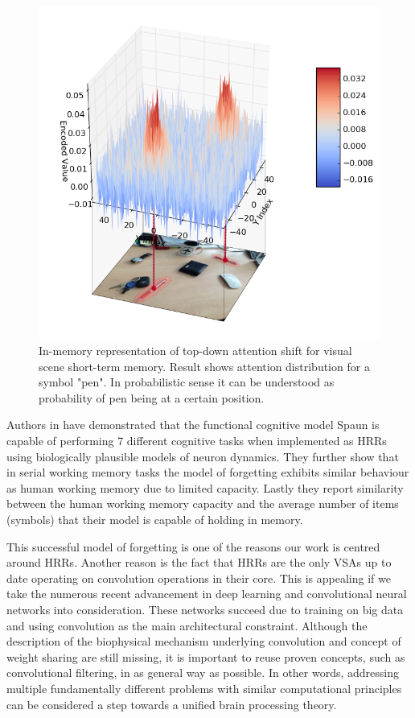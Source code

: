 \documentclass[conference]{IEEEtran}
\begin{document}
	
	\begin{figure}
		\center
		\includegraphics[width=0.9\columnwidth]{img/probe_for_pen_w_img.png}
		\caption{In-memory representation of top-down attention shift for visual scene short-term memory. Result shows attention distribution for a symbol "pen". In probabilistic sense it can be understood as probability of pen being at a certain position.}
	\end{figure}
	
	
	Authors in \cite{Eliasmith:2012:LargeScaleModel} have demonstrated that the functional cognitive model Spaun is capable of performing 7 different cognitive tasks when implemented as HRRs using biologically plausible models of neuron dynamics.
They further show that in serial working memory tasks the model of forgetting exhibits similar behaviour as human working memory due to limited capacity.
Lastly they report similarity between the human working memory capacity and the average number of items (symbols) that their model is capable of holding in memory.

	This successful model of forgetting is one of the reasons our work is centred around HRRs. Another reason is the fact that HRRs are the only VSAs up to date operating on convolution operations in their core.
This is appealing if we take the numerous recent advancement in deep learning and convolutional neural networks into consideration.
These networks succeed due to training on big data and using convolution as the main architectural constraint.
Although the description of the biophysical mechanism underlying convolution and concept of weight sharing are still missing, it is important to reuse proven concepts, such as convolutional filtering, in as general way as possible.
In other words, addressing multiple fundamentally different problems with similar computational principles can be considered a step towards a unified brain processing theory.
	
\end{document}
